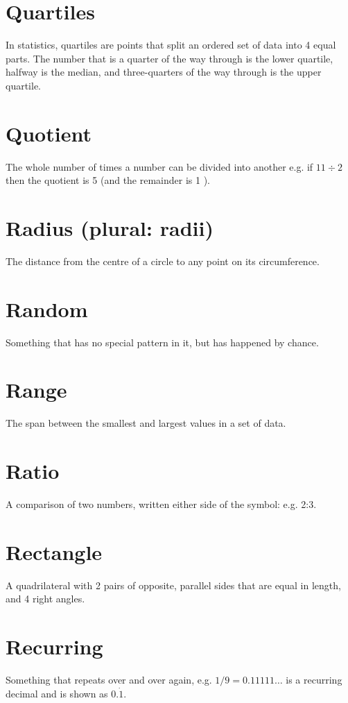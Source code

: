 \documentclass[10pt]{article}
\begin{document}
\section*{Quartiles}
In statistics, quartiles are points that split an ordered set of data into 4 equal parts. The number that is a quarter of the way through is the lower quartile, halfway is the median, and three-quarters of the way through is the upper quartile.

\section*{Quotient}
The whole number of times a number can be divided into another e.g. if $11 \div 2$ then the quotient is 5 (and the remainder is 1 ).

\section*{Radius (plural: radii)}
The distance from the centre of a circle to any point on its circumference.

\section*{Random}
Something that has no special pattern in it, but has happened by chance.

\section*{Range}
The span between the smallest and largest values in a set of data.

\section*{Ratio}
A comparison of two numbers, written either side of the symbol: e.g. 2:3.

\section*{Rectangle}
A quadrilateral with 2 pairs of opposite, parallel sides that are equal in length, and 4 right angles.

\section*{Recurring}
Something that repeats over and over again, e.g. $1 / 9=0.11111 \ldots$ is a recurring decimal and is shown as $0 . \dot{1}$.
\end{document}
